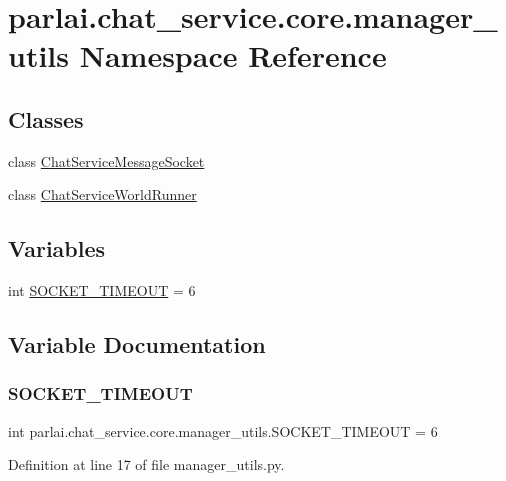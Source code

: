 \hypertarget{namespaceparlai_1_1chat__service_1_1core_1_1manager__utils}{}\section{parlai.\+chat\+\_\+service.\+core.\+manager\+\_\+utils Namespace Reference}
\label{namespaceparlai_1_1chat__service_1_1core_1_1manager__utils}
\subsection*{Classes}
\begin{DoxyCompactItemize}
\item 
class \hyperlink{classparlai_1_1chat__service_1_1core_1_1manager__utils_1_1ChatServiceMessageSocket}{Chat\+Service\+Message\+Socket}
\item 
class \hyperlink{classparlai_1_1chat__service_1_1core_1_1manager__utils_1_1ChatServiceWorldRunner}{Chat\+Service\+World\+Runner}
\end{DoxyCompactItemize}
\subsection*{Variables}
\begin{DoxyCompactItemize}
\item 
int \hyperlink{namespaceparlai_1_1chat__service_1_1core_1_1manager__utils_aea64a209f580a51cf4a9514506ae5317}{S\+O\+C\+K\+E\+T\+\_\+\+T\+I\+M\+E\+O\+UT} = 6
\end{DoxyCompactItemize}


\subsection{Variable Documentation}
\mbox{\label{namespaceparlai_1_1chat__service_1_1core_1_1manager__utils_aea64a209f580a51cf4a9514506ae5317}} 
\subsubsection{\texorpdfstring{S\+O\+C\+K\+E\+T\+\_\+\+T\+I\+M\+E\+O\+UT}{SOCKET\_TIMEOUT}}
{\footnotesize\ttfamily int parlai.\+chat\+\_\+service.\+core.\+manager\+\_\+utils.\+S\+O\+C\+K\+E\+T\+\_\+\+T\+I\+M\+E\+O\+UT = 6}



Definition at line 17 of file manager\+\_\+utils.\+py.

